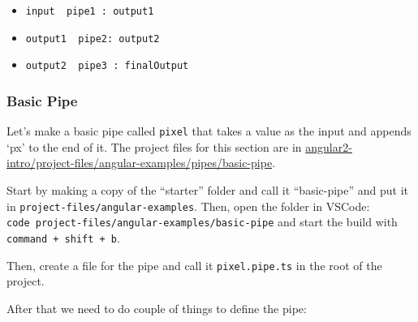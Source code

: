 \documentclass[12pt,]{article}
\providecommand{\tightlist}{%
  \setlength{\itemsep}{0pt}\setlength{\parskip}{0pt}}
\begin{document}
\begin{itemize}
  \begin{itemize}
  \tightlist
  \item
    \texttt{input\ \textbar{}\ pipe1\ :\ output1}
  \item
    \texttt{output1\ \textbar{}\ pipe2:\ output2}
  \item
    \texttt{output2\ \textbar{}\ pipe3\ :\ finalOutput}
  \end{itemize}
\end{itemize}

\subsubsection{Basic Pipe}\label{basic-pipe}

Let's make a basic pipe called \texttt{pixel} that takes a value as the
input and appends `px' to the end of it. The project files for this
section are in
\href{https://github.com/aminmeyghani/angular2-intro/tree/master/project-files/angular-examples/pipes/basic-pipe}{angular2-intro/project-files/angular-examples/pipes/basic-pipe}.

Start by making a copy of the ``starter'' folder and call it
``basic-pipe'' and put it in \texttt{project-files/angular-examples}.
Then, open the folder in VSCode:
\texttt{code\ project-files/angular-examples/basic-pipe} and start the
build with \texttt{command\ +\ shift\ +\ b}.

Then, create a file for the pipe and call it \texttt{pixel.pipe.ts} in
the root of the project.

After that we need to do couple of things to define the pipe:
\end{document}
